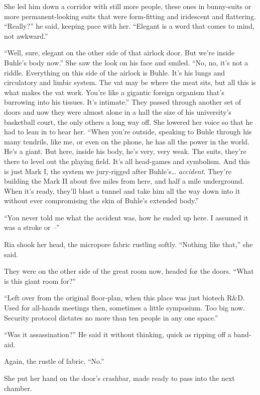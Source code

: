 She led him down a corridor with still more people, these ones in 
bunny-suits or more permanent-looking suits that were form-fitting and 
iridescent and flattering. “Really?” he said, keeping pace with 
her. “Elegant is a word that comes to mind, not awkward.”

“Well, sure, elegant on the other side of that airlock door. But 
we're inside Buhle's body now.” She saw the look on his face and 
smiled. “No, no, it's not a riddle. Everything on this side of the 
airlock is Buhle. It's his lungs and circulatory and limbic system. The 
vat may be where the meat sits, but all this is what makes the vat 
work. You're like a gigantic foreign organism that's burrowing into his 
tissues. It's intimate.” They passed through another set of doors and 
now they were almost alone in a hall the size of his university's 
basketball court, the only others a long way off. She lowered her voice 
so that he had to lean in to hear her. “When you're outside, speaking 
to Buhle through his many tendrils, like me, or even on the phone, he 
has all the power in the world. He's a giant. But here, inside his 
body, he's very, very weak. The suits, they're there to level out the 
playing field. It's all head-games and symbolism. And this is just Mark 
I, the system we jury-rigged after Buhle's\ldots{} \emph{accident}. They're 
building the Mark II about five miles from here, and half a mile 
underground. When it's ready, they'll blast a tunnel and take him all 
the way down into it without ever compromising the skin of Buhle's 
extended body.”

“You never told me what the accident was, how he ended up here. I 
assumed it was a stroke or --”

Ria shook her head, the micropore fabric rustling softly. “Nothing 
like that,” she said.

They were on the other side of the great room now, headed for the 
doors. “What is this giant room for?”

“Left over from the original floor-plan, when this place was just 
biotech R{\&}D. Used for all-hands meetings then, sometimes a little 
symposium. Too big now. Security protocol dictates no more than ten 
people in any one space.”

“Was it assassination?” He said it without thinking, quick as 
ripping off a band-aid.

Again, the rustle of fabric. “No.”

She put her hand on the door's crashbar, made ready to pass into the 
next chamber.

